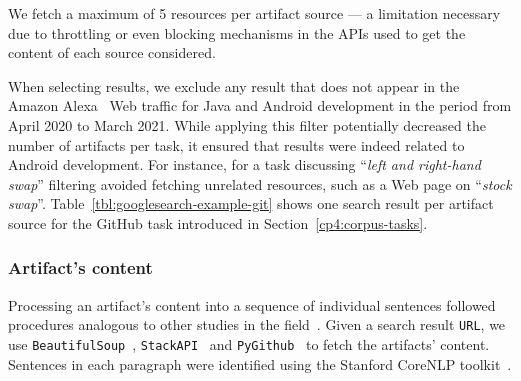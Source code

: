 We fetch a maximum of 5 resources per artifact source --- a limitation necessary due to throttling or even blocking mechanisms in the APIs used to get the content of each source considered. 


When selecting results, we exclude any result that does not appear in the Amazon Alexa~\cite{alexa} Web  traffic for Java and Android development in the period from April 2020 to March 2021. 
While applying this filter potentially decreased the number of artifacts per task, it ensured that results were indeed related to Android development. 
For instance, for a task discussing ``\textit{left and right-hand swap}'' 
filtering avoided fetching unrelated resources, such as a Web page on  ``\textit{stock swap}''.
Table~\ref{tbl:googlesearch-example-git} shows one search result per artifact source for the GitHub task introduced in Section~\ref{cp4:corpus-tasks}.




\subsubsection{Artifact's content}


Processing an artifact's content into a sequence of individual sentences 
followed procedures analogous to other studies in the field~\cite{Arya2019, nadi2020}.
Given a search result \texttt{URL}, we use \texttt{BeautifulSoup}~\cite{beautifulsoup4},
\texttt{StackAPI}~\cite{StackAPI} and \texttt{PyGithub}~\cite{PyGithub}
to fetch the artifacts' content. Sentences in each paragraph
were identified using the Stanford CoreNLP toolkit~\cite{CoreNLP}.








